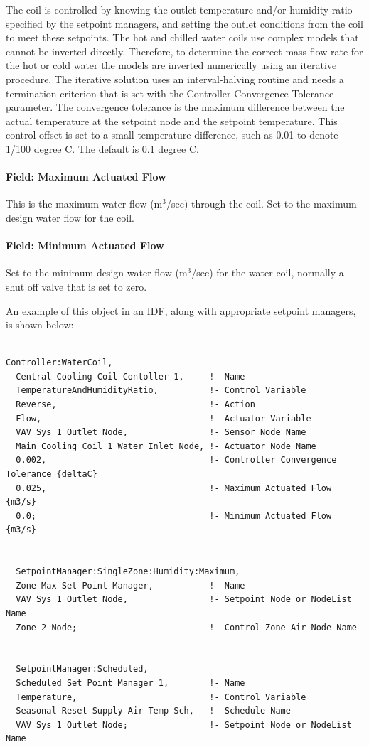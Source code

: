 The coil is controlled by knowing the outlet temperature and/or humidity ratio specified by the setpoint managers, and setting the outlet conditions from the coil to meet these setpoints. The hot and chilled water coils use complex models that cannot be inverted directly. Therefore, to determine the correct mass flow rate for the hot or cold water the models are inverted numerically using an iterative procedure. The iterative solution uses an interval-halving routine and needs a termination criterion that is set with the Controller Convergence Tolerance parameter. The convergence tolerance is the maximum difference between the actual temperature at the setpoint node and the setpoint temperature. This control offset is set to a small temperature difference, such as 0.01 to denote 1/100 degree C. The default is 0.1 degree C.

\paragraph{Field: Maximum Actuated Flow}\label{field-maximum-actuated-flow}

This is the maximum water flow (m\(^{3}\)/sec) through the coil. Set to the maximum design water flow for the coil.

\paragraph{Field: Minimum Actuated Flow}\label{field-minimum-actuated-flow}

Set to the minimum design water flow (m\(^{3}\)/sec) for the water coil, normally a shut off valve that is set to zero.

An example of this object in an IDF, along with appropriate setpoint managers, is shown below:

\begin{lstlisting}

Controller:WaterCoil,
  Central Cooling Coil Contoller 1,     !- Name
  TemperatureAndHumidityRatio,          !- Control Variable
  Reverse,                              !- Action
  Flow,                                 !- Actuator Variable
  VAV Sys 1 Outlet Node,                !- Sensor Node Name
  Main Cooling Coil 1 Water Inlet Node, !- Actuator Node Name
  0.002,                                !- Controller Convergence Tolerance {deltaC}
  0.025,                                !- Maximum Actuated Flow {m3/s}
  0.0;                                  !- Minimum Actuated Flow {m3/s}


  SetpointManager:SingleZone:Humidity:Maximum,
  Zone Max Set Point Manager,           !- Name
  VAV Sys 1 Outlet Node,                !- Setpoint Node or NodeList Name
  Zone 2 Node;                          !- Control Zone Air Node Name


  SetpointManager:Scheduled,
  Scheduled Set Point Manager 1,        !- Name
  Temperature,                          !- Control Variable
  Seasonal Reset Supply Air Temp Sch,   !- Schedule Name
  VAV Sys 1 Outlet Node;                !- Setpoint Node or NodeList Name
\end{lstlisting}

